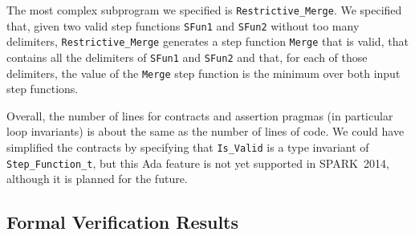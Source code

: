 \documentclass[10pt,a4paper,twocolumn]{article}
\newcommand{\newspark}{SPARK~2014\xspace}
\newcommand{\SPARK}[1]{\lstinline[language=Ada,basicstyle={\footnotesize
      \sffamily},framesep=0pt]$#1$}
\begin{document}
The most complex subprogram we specified is \SPARK{Restrictive_Merge}.  We
specified that, given two valid step functions \SPARK{SFun1} and \SPARK{SFun2}
without too many delimiters, \SPARK{Restrictive_Merge} generates a step
function \SPARK{Merge} that is valid, that contains all the delimiters of
\SPARK{SFun1} and \SPARK{SFun2} and that, for each of those delimiters,
the value of the \SPARK{Merge} step function is the minimum over both input
step functions.



Overall, the number of lines for contracts and assertion pragmas (in particular
loop invariants) is about the same as the number of lines of code. We could
have simplified the contracts by specifying that \SPARK{Is_Valid} is a type
invariant of \SPARK{Step_Function_t}, but this Ada feature is not yet supported
in \newspark, although it is planned for the future.

\subsection{Formal Verification Results}
\end{document}
